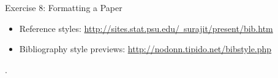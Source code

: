\documentclass[10pt,times]{beamer}
\begin{document}
\begin{frame}[fragile]{Exercise 8: Formatting a Paper}

\begin{center}
\end{center}

\begin{center}
\end{center}

\begin{center}
\end{center}
\begin{itemize}

\item Reference styles: 
\href{http://sites.stat.psu.edu/~surajit/present/bib.htm}{http://sites.stat.psu.edu/~surajit/present/bib.htm}

\item Bibliography style previews: 
\href{http://nodonn.tipido.net/bibstyle.php}{http://nodonn.tipido.net/bibstyle.php}
\end{itemize}

\begin{center}
%
.
\end{center}

\end{frame}


\end{document}
